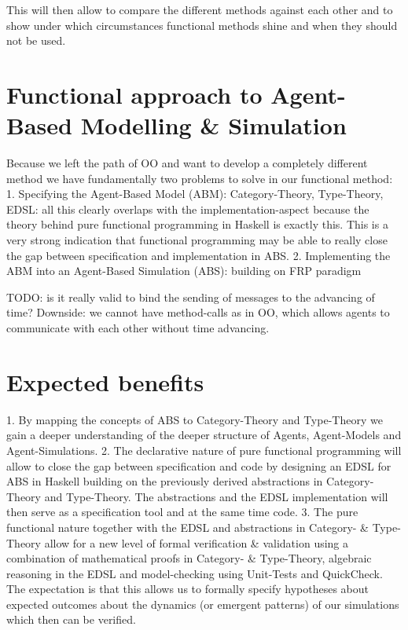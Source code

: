 This will then allow to compare the different methods against each other and to show under which circumstances functional methods shine and when they should not be used.
 
\section{Functional approach to Agent-Based Modelling \& Simulation}
Because we left the path of OO and want to develop a completely different method we have fundamentally two problems to solve in our functional method:
1. Specifying the Agent-Based Model (ABM): Category-Theory, Type-Theory, EDSL: all this clearly overlaps with the  implementation-aspect because the theory behind pure functional programming in Haskell is exactly this. This is a very strong indication that functional programming may be able to really close the gap between specification and implementation in ABS.
2. Implementing the ABM into an Agent-Based Simulation (ABS): building on FRP paradigm

TODO: is it really valid to bind the sending of messages to the advancing of time?
Downside: we cannot have method-calls as in OO, which allows agents to communicate with each other without time advancing. 

\section{Expected benefits}
1. By mapping the concepts of ABS to Category-Theory and Type-Theory we gain a deeper understanding of the deeper structure of Agents, Agent-Models and Agent-Simulations.
2. The declarative nature of pure functional programming will allow to close the gap between specification and code by designing an EDSL for ABS in Haskell building on the previously derived abstractions in Category-Theory and Type-Theory. The abstractions and the EDSL implementation will then serve as a specification tool and at the same time code.
3. The pure functional nature together with the EDSL and abstractions in Category- \& Type-Theory allow for a new level of formal verification \& validation using a combination of mathematical proofs in Category- \& Type-Theory, algebraic reasoning in the EDSL and model-checking using Unit-Tests and QuickCheck. The expectation is that this allows us to formally specify hypotheses about expected outcomes about the dynamics (or emergent patterns) of our simulations which then can be verified.